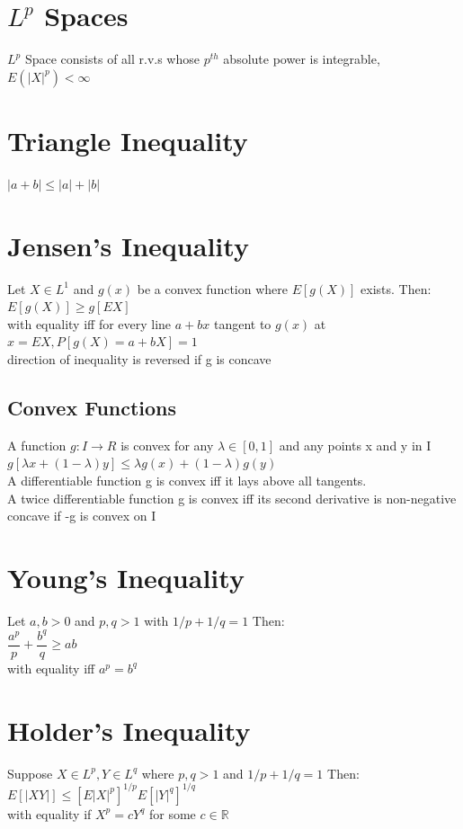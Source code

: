 \documentclass[openany]{book}
\begin{document}
\begin{flushleft}
\section{$L^p$ Spaces}
$L^p$ Space consists of all r.v.s whose $p^{th}$ absolute power is integrable, $E(|X|^p)<\infty$\\
\section{Triangle Inequality}
$|a+b|\leq |a|+|b|$\\
\section{Jensen's Inequality}
Let $X \in L^1$ and $g(x)$ be a convex function where $E[g(X)]$ exists. Then:\\
$E[g(X)]\geq g[EX]$\\
with equality iff for every line $a+bx$ tangent to $g(x)$ at $x=EX, P[g(X)=a+bX]=1$\\
direction of inequality is reversed if g is concave\\
\subsection{Convex Functions}
A function $g: I\to R$ is convex for any $\lambda \in [0,1]$ and any points x and y in I\\
$g[\lambda x+(1-\lambda)y]\leq \lambda g(x)+(1-\lambda)g(y)$\\
A differentiable function g is convex iff it lays above all tangents.\\
A twice differentiable function g is convex iff its second derivative is non-negative\\
concave if -g is convex on I
\section{Young's Inequality}
Let $a,b >0$ and $p,q>1$ with $1/p+1/q=1$ Then:\\
$\dfrac{a^p}{p}+\dfrac{b^q}{q}\geq ab$\\
with equality iff $a^p=b^q$
\section{Holder's Inequality}
Suppose $X \in L^p, Y \in L^q$ where $p,q>1$ and $1/p+1/q=1$ Then:\\
$E[|XY|]\leq [E|X|^p]^{1/p}E[|Y|^q]^{1/q}$\\
with equality if $X^p=cY^q$ for some $c \in \mathbb{R}$

\end{flushleft}
\end{document}
